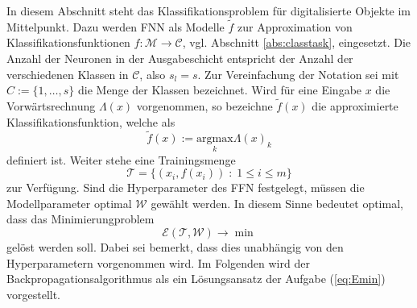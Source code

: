 In diesem Abschnitt steht das Klassifikationsproblem für digitalisierte Objekte im Mittelpunkt. Dazu werden FNN als Modelle $\tilde{f}$ zur Approximation von Klassifikationsfunktionen $f: \mathcal{M} \rightarrow \mathcal{C}$, vgl. Abschnitt \ref{abs:classtask}, eingesetzt. Die Anzahl der Neuronen in der Ausgabeschicht entspricht der Anzahl der verschiedenen Klassen in $\mathcal{C}$, also $s_l=s$. Zur Vereinfachung der Notation sei mit $C:=\{1, \ldots, s\}$ die Menge der Klassen bezeichnet. Wird für eine Eingabe $x$ die Vorwärtsrechnung $\Lambda(x)$ vorgenommen, so bezeichne $\tilde{f}(x)$ die approximierte Klassifikationsfunktion, welche als
\begin{equation*}
    \tilde{f}(x):= \underset{k}{\mathrm{argmax}} \Lambda(x)_k
\end{equation*}
definiert ist.
Weiter stehe eine Trainingsmenge 
\begin{equation*}
    \mathcal{T}= \{(x_i, f(x_i))\; : \; 1 \leq i \leq m\}  
\end{equation*}
zur Verfügung. 
Sind die Hyperparameter des FFN festgelegt, müssen die Modellparameter optimal $\mathcal{W}$ gewählt werden. In diesem Sinne bedeutet optimal, dass das Minimierungproblem 
\begin{equation}
    \label{eq:Emin}
    \mathcal{E}(\mathcal{T}, \mathcal{W}) \rightarrow \min
\end{equation} 
gelöst werden soll. Dabei sei bemerkt, dass dies unabhängig von den Hyperparametern vorgenommen wird. Im Folgenden wird der Backpropagationsalgorithmus als ein Lösungsansatz der Aufgabe (\ref{eq:Emin}) vorgestellt.  

